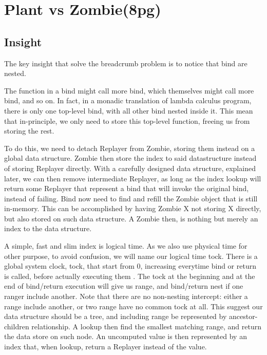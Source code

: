 \section{Plant vs Zombie(8pg)}
\subsection{Insight}
The key insight that solve the breadcrumb problem is to notice that bind are nested.

The function in a bind might call more bind, which themselves might call more bind, and so on. In fact, in a monadic translation of lambda calculus program, there is only one top-level bind, with all other bind nested inside it. This mean that in-principle, we only need to store this top-level function, freeing us from storing the rest.

To do this, we need to detach Replayer from Zombie, storing them instead on a global data structure. Zombie then store the index to said datastructure instead of storing Replayer directly. With a carefully designed data structure, explained later, we can then remove intermediate Replayer, as long as the index lookup will return some Replayer that represent a bind that will invoke the original bind, instead of failing. Bind now need to find and refill the Zombie object that is still in-memory. This can be accomplished by having Zombie X not storing X directly, but also stored on such data structure. A Zombie then, is nothing but merely an index to the data structure.

A simple, fast and slim index is logical time. As we also use physical time for other purpose, to avoid confusion, we will name our logical time tock. There is a global system clock, tock, that start from 0, increasing everytime bind or return is called, before actually executing them . The tock at the beginning and at the end of bind/return execution will give us range, and bind/return nest if one ranger include another. Note that there are no non-nesting intercept: either a range include another, or two range have no common tock at all. This suggest our data structure should be a tree, and including range be represented by ancestor-children relationship. A lookup then find the smallest matching range, and return the data store on such node. An uncomputed value is then represented by an index that, when lookup, return a Replayer instead of the value.

